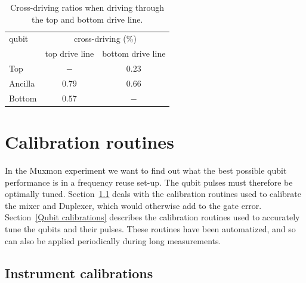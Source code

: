       \vspace{2cm}
      \begin{table}[h]
        \begin{tabular}{l c c}
          \toprule
          qubit & \multicolumn{2}{c}{cross-driving (\%)} \\
          \cmidrule(lr){2-3}
               & top drive line & bottom drive line \\
          \midrule
          Top     & $-$    & $0.23$ \\
          Ancilla & $0.79$ & $0.66$ \\
          Bottom  & $0.57$ & $-$    \\
          \bottomrule
        \end{tabular}
        \caption{Cross-driving ratios when driving through the top and bottom drive line.}
        \label{tab:cross-driving}
      \end{table}

  \chapter{Calibration routines}
    \label{ch:Calibration routines}
    In the Muxmon experiment we want to find out what the best possible qubit performance is in a frequency reuse set-up. The qubit pulses must therefore be optimally tuned. Section~\ref{Instrument calibrations} deals with the calibration routines used to calibrate the mixer and Duplexer, which would otherwise add to the gate error. Section~\ref{Qubit calibrations} describes the calibration routines used to accurately tune the qubits and their pulses. These routines have been automatized, and so can also be applied periodically during long measurements.

    \section{Instrument calibrations}
      \label{Instrument calibrations}


